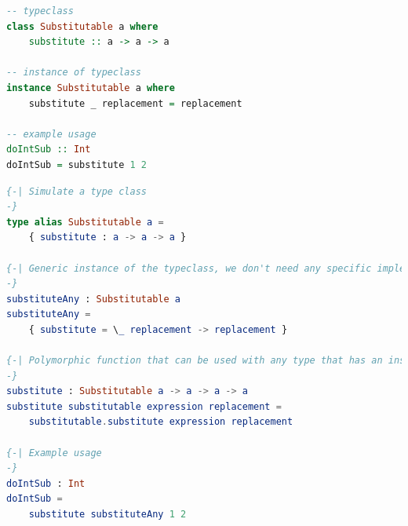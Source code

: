 \begin{lstlisting}[language=Haskell,style=inline,caption={Haskell typeclass example},label={lst:haskell-typeclass}]
-- typeclass
class Substitutable a where 
    substitute :: a -> a -> a
    
-- instance of typeclass
instance Substitutable a where
    substitute _ replacement = replacement

-- example usage
doIntSub :: Int
doIntSub = substitute 1 2 
\end{lstlisting}


\begin{lstlisting}[language=elm,style=inline,caption={Elm typeclass simulation example},label={lst:elm-typeclass}]
{-| Simulate a type class
-}
type alias Substitutable a =
    { substitute : a -> a -> a }

{-| Generic instance of the typeclass, we don't need any specific implementation for each type/sort, we just want to assure that the expression and replacement are of the same type. This is constrained by the `substitute` function signature in the (simulated) typeclass.
-}
substituteAny : Substitutable a
substituteAny =
    { substitute = \_ replacement -> replacement }

{-| Polymorphic function that can be used with any type that has an instance of the `Substitutable` typeclass.
-}
substitute : Substitutable a -> a -> a -> a
substitute substitutable expression replacement =
    substitutable.substitute expression replacement

{-| Example usage
-}
doIntSub : Int
doIntSub =
    substitute substituteAny 1 2
\end{lstlisting}